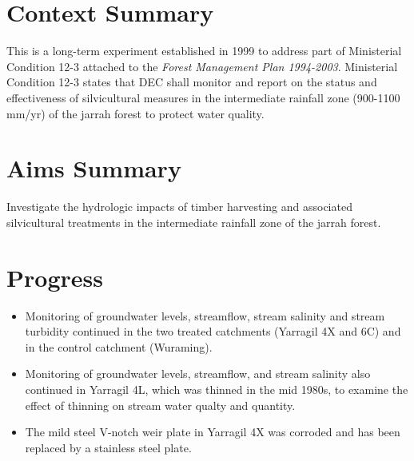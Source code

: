 \documentclass[version=last, paper=a4, DIV=18, usenames, dvipsnames]{scrartcl}
\begin{document}
\section{Context Summary}



This is a long-term experiment established in 1999 to address part of Ministerial Condition 12-3 attached to the \emph{Forest Management Plan 1994-2003}. Ministerial Condition 12-3 states that DEC shall monitor and report on the status and effectiveness of silvicultural measures in the intermediate rainfall zone (900-1100 mm/yr) of the jarrah forest to protect water quality.






\section{Aims Summary}



Investigate the hydrologic impacts of timber harvesting and associated silvicultural treatments in the intermediate rainfall zone of the jarrah forest.






\section{Progress}



\begin{itemize}

  \item Monitoring of groundwater levels, streamflow, stream salinity and stream turbidity continued in the two treated catchments (Yarragil 4X and 6C) and in the control catchment (Wuraming).

  \item Monitoring of groundwater levels, streamflow, and stream salinity also continued in Yarragil 4L, which was thinned in the mid 1980s, to examine the effect of thinning on stream water qualty and quantity.

  \item The mild steel V-notch weir plate in Yarragil 4X was corroded and has been replaced by a stainless steel plate.

\end{itemize}
\end{document}
